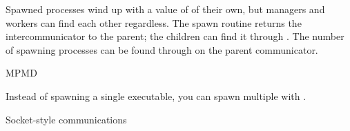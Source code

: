 Spawned processes wind up with a value of  of their
own, but managers and workers can find each other regardless.
The spawn routine returns the intercommunicator to the parent; the children
can find it through . The number of
spawning processes can be found through
 on the parent communicator.


 {MPMD}

Instead of spawning a single executable, you can spawn multiple with
.

 {Socket-style communications}



